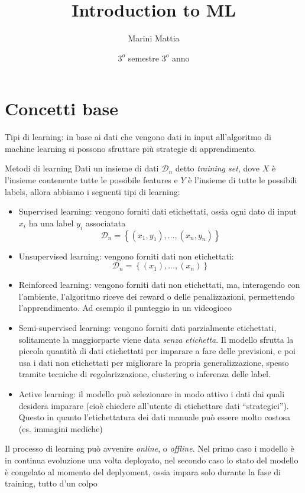 
\title{Introduction to ML}
\author{Marini Mattia}
\date{$ 3^o $ semestre $ 3^o $ anno}


\maketitle
\tableofcontents
\newpage

\section{Concetti base}
Tipi di learning: in base ai dati che vengono dati in input all'algoritmo di machine learning si possono sfruttare più strategie di apprendimento.

\begin{definizione}{Metodi di learning}
	Dati un insieme di dati $ \mathcal{D}_n $ detto \textit{training set}, dove $ X $ è l'insieme contenente tutte le possibile features e $ Y $ è l'insieme di tutte le possibili labels, allora abbiamo i seguenti tipi di learning:
	\begin{itemize}
		\item Supervised learning: vengono forniti dati etichettati, ossia ogni dato di input $ x_i $ ha una label $ y_i $ associatata
		      \[
			      \mathcal{D}_{n} = \left\{\left(x_1, y_1\right), \ldots , \left(x_n, y_n\right)\right\}
		      \]
		\item Unsupervised learning: vengono forniti dati non etichettati:
		      \[
			      \mathcal{D}_{n} = \left\{\left(x_1\right), \ldots , \left(x_n\right)\right\}
		      \]
		\item Reinforced learning: vengono forniti dati non etichettati, ma, interagendo con l'ambiente, l'algoritmo riceve dei reward o delle penalizzazioni, permettendo l'apprendimento. Ad esempio il punteggio in un videogioco
		\item Semi-supervised learning: vengono forniti dati parzialmente etichettati, solitamente la maggiorparte viene data \textit{senza etichetta}. Il modello sfrutta la piccola quantità di dati etichettati per imparare a fare delle previsioni, e poi usa i dati non etichettati per migliorare la propria generalizzazione, spesso tramite tecniche di regolarizzazione, clustering o inferenza delle label.
		\item Active learning: il modello può selezionare in modo attivo i dati dai quali desidera imparare (cioè chiedere all’utente di etichettare dati “strategici”). Questo in quanto l'etichettatura dei dati manuale può essere molto costosa (es. immagini mediche)
	\end{itemize}
	Il processo di learning può avvenire \textit{online}, o \textit{offline}. Nel primo caso i modello è in continua evoluzione una volta deployato, nel secondo caso lo stato del modello è congelato al momento del deplyoment, ossia impara solo durante la fase di training, tutto d'un colpo
\end{definizione}

